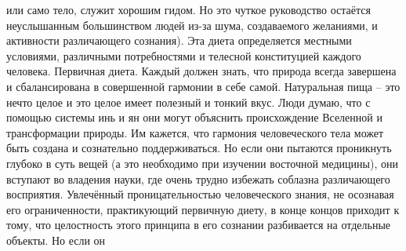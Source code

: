 \documentclass[a4paper]{book}
\begin{document}
или само тело, служит хорошим гидом. Но это чуткое руководство остаётся неуслышанным
большинством людей из-за шума, создаваемого желаниями, и активности различающего
сознания). Эта диета определяется местными условиями, различными потребностями и
телесной конституцией каждого человека.
Первичная диета. Каждый должен знать, что природа всегда завершена и
сбалансирована в совершенной гармонии в себе самой. Натуральная пища – это нечто целое
и это целое имеет полезный и тонкий вкус.
Люди думаю, что с помощью системы инь и ян они могут объяснить происхождение
Вселенной и трансформации природы. Им кажется, что гармония человеческого тела может
быть создана и сознательно поддерживаться. Но если они пытаются проникнуть глубоко в
суть вещей (а это необходимо при изучении восточной медицины), они вступают во владения
науки, где очень трудно избежать соблазна различающего восприятия.
Увлечённый проницательностью человеческого знания, не осознавая его
ограниченности, практикующий первичную диету, в конце концов приходит к тому, что
целостность этого принципа в его сознании разбивается на отдельные объекты. Но если он
\end{document}
